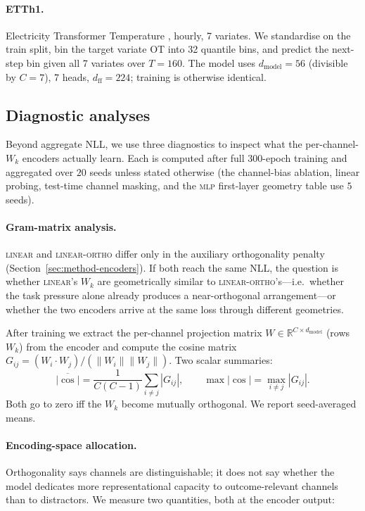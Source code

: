 \documentclass[11pt]{article}
\begin{document}
\paragraph{ETTh1.} Electricity Transformer Temperature
\citep{zhou2021informer}, hourly, 7 variates. We standardise on the
train split, bin the target variate
OT into 32 quantile bins, and predict the next-step bin given all 7
variates over $T{=}160$. The model uses $d_{\text{model}}{=}56$
(divisible by $C{=}7$), 7 heads, $d_{\text{ff}}{=}224$; training is
otherwise identical.

\subsection{Diagnostic analyses}
\label{sec:method-diagnostics}

Beyond aggregate NLL, we use three diagnostics to inspect what the
per-channel-$W_k$ encoders actually learn. Each is computed after
full 300-epoch training and aggregated over $20$ seeds unless
stated otherwise (the channel-bias ablation, linear probing,
test-time channel masking, and the \textsc{mlp} first-layer
geometry table use $5$ seeds).

\paragraph{Gram-matrix analysis.}
\textsc{linear} and \textsc{linear-ortho} differ only in the
auxiliary orthogonality penalty (Section~\ref{sec:method-encoders}).
If both reach the same NLL, the question is whether
\textsc{linear}'s $W_k$ are geometrically similar to
\textsc{linear-ortho}'s---i.e.\ whether the task pressure alone
already produces a near-orthogonal arrangement---or whether the two
encoders arrive at the same loss through different geometries.

After training we extract the per-channel projection matrix $W \in
\mathbb{R}^{C \times d_{\text{model}}}$ (rows $W_k$) from the encoder
and compute the cosine matrix $G_{ij} = (W_i \cdot W_j) / (\|W_i\|
\|W_j\|)$. Two scalar summaries:
\[
\overline{|\cos|} = \frac{1}{C(C-1)} \sum_{i \ne j} |G_{ij}|,
\qquad
\max|\cos| = \max_{i \ne j} |G_{ij}|.
\]
Both go to zero iff the $W_k$ become mutually orthogonal. We report
seed-averaged means.

\paragraph{Encoding-space allocation.}
Orthogonality says channels are distinguishable; it does not say
whether the model dedicates more representational capacity to
outcome-relevant channels than to distractors. We measure two
quantities, both at the encoder output:
\end{document}
